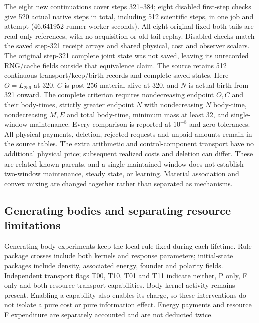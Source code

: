 The eight new continuations cover steps 321--384; eight disabled first-step checks give 520 actual native steps in total, including 512 scientific steps, in one job and attempt (46.641952 runner-worker seconds). All eight original fixed-both tails are read-only references, with no acquisition or old-tail replay. Disabled checks match the saved step-321 receipt arrays and shared physical, cost and observer scalars. The original step-321 complete joint state was not saved, leaving its unrecorded RNG/cache fields outside that equivalence claim. The source retains 512 continuous transport/keep/birth records and complete saved states. Here $O=L_{256}$ at 320, $C$ is post-256 material alive at 320, and $N$ is actual birth from 321 onward. The complete criterion requires nondecreasing endpoint $O,C$ and their body-times, strictly greater endpoint $N$ with nondecreasing $N$ body-time, nondecreasing $M,E$ and total body-time, minimum mass at least 32, and single-window maintenance. Every comparison is reported at $10^{-8}$ and zero tolerances. All physical payments, deletion, rejected requests and unpaid amounts remain in the source tables. The extra arithmetic and control-component transport have no additional physical price; subsequent realized costs and deletion can differ. These are related known parents, and a single maintained window does not establish two-window maintenance, steady state, or learning. Material association and convex mixing are changed together rather than separated as mechanisms.

\subsection*{Generating bodies and separating resource limitations}
Generating-body experiments keep the local rule fixed during each lifetime. Rule-package crosses include both kernels and response parameters; initial-state packages include density, associated energy, founder and polarity fields. Independent transport flags T00, T10, T01 and T11 indicate neither, P only, F only and both resource-transport capabilities. Body-kernel activity remains present. Enabling a capability also enables its charge, so these interventions do not isolate a pure cost or pure information effect. Energy payments and resource F expenditure are separately accounted and are not deducted twice.

